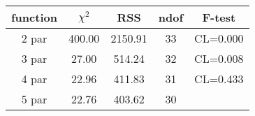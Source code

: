 \begin{tabular}{c|c|c|c|c}
function & $\chi^2$ & RSS & ndof & F-test \\
\hline
2 par & 400.00 & 2150.91 & 33 & CL=0.000 \\
3 par & 27.00 & 514.24 & 32 & CL=0.008 \\
4 par & 22.96 & 411.83 & 31 & CL=0.433 \\
5 par & 22.76 & 403.62 & 30 & \\
\hline
\end{tabular}